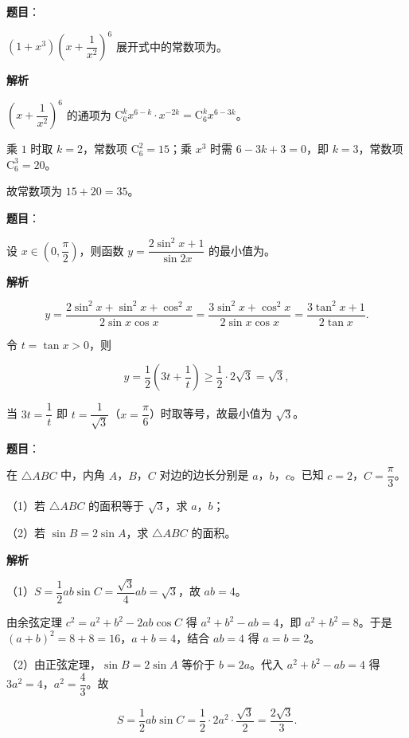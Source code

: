 \begin{answer}

\textbf{题目}：

$\left(1+x^3\right)\left(x+\dfrac1{x^2}\right)^6$ 展开式中的常数项为\gkblank{}。

\textbf{解析}

$\left(x+\dfrac1{x^2}\right)^6$ 的通项为 $\mathrm C_6^kx^{6-k}\cdot x^{-2k}=\mathrm C_6^kx^{6-3k}$。

乘 $1$ 时取 $k=2$，常数项 $\mathrm C_6^2=15$；乘 $x^3$ 时需 $6-3k+3=0$，即 $k=3$，常数项 $\mathrm C_6^3=20$。

故常数项为 $15+20=35$。


\end{answer}
\begin{answer}

\textbf{题目}：

设 $x\in\left(0,\dfrac{\pi}{2}\right)$，则函数 $y=\dfrac{2\sin^2x+1}{\sin2x}$ 的最小值为\gkblank{}。

\textbf{解析}

\nopagebreak[4]
\[y=\frac{2\sin^2x+\sin^2x+\cos^2x}{2\sin x\cos x}=\frac{3\sin^2x+\cos^2x}{2\sin x\cos x}=\frac{3\tan^2x+1}{2\tan x}.\]

令 $t=\tan x>0$，则

\nopagebreak[4]
\[y=\frac12\left(3t+\frac1t\right)\geqslant\frac12\cdot2\sqrt3=\sqrt3,\]

当 $3t=\dfrac1t$ 即 $t=\dfrac1{\sqrt3}$（$x=\dfrac{\pi}{6}$）时取等号，故最小值为 $\sqrt3$。


\end{answer}
\begin{answer}

\textbf{题目}：

在 $\triangle ABC$ 中，内角 $A$，$B$，$C$ 对边的边长分别是 $a$，$b$，$c$。已知 $c=2$，$C=\dfrac{\pi}{3}$。

（1）若 $\triangle ABC$ 的面积等于 $\sqrt3$，求 $a$，$b$；

（2）若 $\sin B=2\sin A$，求 $\triangle ABC$ 的面积。

\textbf{解析}

（1）$S=\dfrac12ab\sin C=\dfrac{\sqrt3}{4}ab=\sqrt3$，故 $ab=4$。

由余弦定理 $c^2=a^2+b^2-2ab\cos C$ 得 $a^2+b^2-ab=4$，即 $a^2+b^2=8$。于是 $(a+b)^2=8+8=16$，$a+b=4$，结合 $ab=4$ 得 $a=b=2$。

（2）由正弦定理，$\sin B=2\sin A$ 等价于 $b=2a$。代入 $a^2+b^2-ab=4$ 得 $3a^2=4$，$a^2=\dfrac43$。故

\nopagebreak[4]
\[S=\frac12ab\sin C=\frac12\cdot2a^2\cdot\frac{\sqrt3}{2}=\frac{2\sqrt3}{3}.\]


\end{answer}
